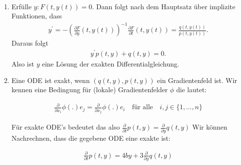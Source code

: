 \begin{solution}
  \phantom{}
\leavevmode \\
\begin{enumerate}[label = \textbf{\alph*)}]
\item Erfülle $y: F(t,y(t)) = 0$. Dann folgt nach dem Hauptsatz über implizite
Funktionen, dass
\begin{align*}
  y^{\prime} = -\left(\frac{\partial F}{\partial y}(t,y(t))\right)^{-1}
  \frac{\partial F}{\partial t}(t,y(t)) = \frac{q(t,y(t))}{p(t,y(t))}.
\end{align*}
Daraus folgt
\begin{align*}
  y^{\prime}p(t,y) + q(t,y) = 0.
\end{align*}
Also ist $y$ eine Lösung der exakten Differentialgleichung.
\item
Eine ODE ist exakt, wenn $(q(t,y), p(t,y))$ ein Gradientenfeld ist. Wir kennen eine
Bedingung für (lokale) Gradientenfelder $\phi$ die lautet:

\begin{align*}
  \frac{\partial}{\partial x_i} \phi(.) e_j = \frac{\partial}{\partial x_j} \phi(.) e_i
  \quad \text{für alle} \quad i, j \in \{1,...,n\}
\end{align*}

Für exakte ODE's bedeutet  das also $\frac{\partial}{\partial t} p(t,y) =
\frac{\partial}{\partial y} q(t,y)$
Wir können Nachrechnen, dass die gegebene ODE eine exakte ist:

\begin{align*}
  \frac{\partial}{\partial t} p(t,y) = 4by + 3
  \frac{\partial}{\partial y} q(t,y)
\end{align*}


\end{enumerate}
\end{solution}
